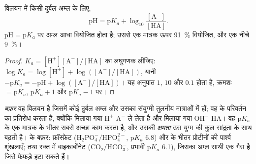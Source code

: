 \begin{theorem}[हेंडरसन--हासेलबाख़]\label{thm:b1:water-small-molecules:hh}
विलयन में किसी दुर्बल अम्ल के लिए,
\[
\mathrm{pH} = \mathrm{p}K_a + \log_{10}\frac{[\mathrm{A^-}]}{[\mathrm{HA}]} .
\]
$\mathrm{pH} = \mathrm{p}K_a$ पर अम्ल आधा वियोजित होता है; उससे एक 
मात्रक ऊपर \qty{91}{\%} वियोजित, और एक नीचे \qty{9}{\%}।
\end{theorem}
\begin{proof}
$K_a = [\mathrm{H^+}][\mathrm{A^-}]/[\mathrm{HA}]$ का लघुगणक लीजिए:
$\log K_a = \log[\mathrm{H^+}] + \log([\mathrm{A^-}]/[\mathrm{HA}])$,
यानी $-\mathrm{p}K_a = -\mathrm{pH} + \log([\mathrm{A^-}]/[\mathrm{HA}])$।
यह अनुपात $1$, $10$ और $0.1$ होता है, क्रमशः  $= \mathrm{p}K_a$,
$\mathrm{p}K_a + 1$ और $\mathrm{p}K_a - 1$ पर।
\end{proof}

\begin{definition}[बफ़र]\label{def:b1:water-small-molecules:buffer}
\emph{बफ़र} वह विलयन है जिसमें कोई दुर्बल अम्ल और उसका
संयुग्मी  तुलनीय मात्राओं में हों; वह  के परिवर्तन का प्रतिरोध
करता है, क्योंकि मिलाया गया $\mathrm{H^+}$ $\mathrm{A^-}$ ले लेता है और
मिलाया गया $\mathrm{OH^-}$ $\mathrm{HA}$। वह p$K_a$ के एक मात्रक के भीतर
सबसे अच्छा काम करता है, और उसकी \emph{क्षमता} उस युग्म की कुल सांद्रता के
साथ बढ़ती है।  के बफ़र: फ़ॉस्फ़ेट
($\mathrm{H_2PO_4^-}/\mathrm{HPO_4^{2-}}$, p$K_a$ 6.8) और  के
भीतर प्रोटीनों की पार्श्व शृंखलाएँ; तथा रक्त में बाइकार्बोनेट
($\mathrm{CO_2}/\mathrm{HCO_3^-}$, प्रभावी p$K_a$ 6.1), जिसका अम्ल
साथी एक गैस है जिसे फेफड़े हटा सकते हैं।
\end{definition}

